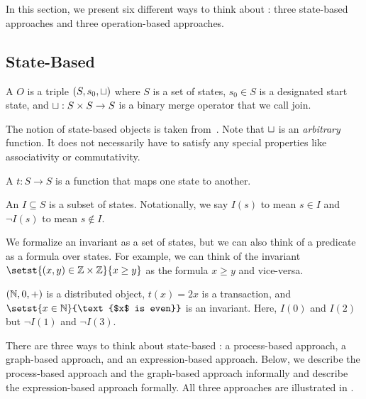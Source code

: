 \section{\Iconfluence{}}
In this section, we present six different ways to think about \Iconfluence{}:
three state-based approaches and three operation-based approaches.

\subsection{State-Based}
\begin{definition}
  A  $O$ is a triple $(S, s_0, \sqcup)$
  where $S$ is a set of states, $s_0 \in S$ is a designated start state, and
  $\sqcup: S \times S \to S$ is a binary merge operator that we call join.
\end{definition}

The notion of state-based objects is taken from~\cite{shapiro2011conflict}.
Note that $\sqcup$ is an \emph{arbitrary} function. It does not necessarily have
to satisfy any special properties like associativity or commutativity.

\begin{definition}
  A  $t: S \to S$ is a function that maps one
  state to another.
\end{definition}

\begin{definition}
  An  $I \subseteq S$ is a subset of states. Notationally,
  we say $I(s)$ to mean $s \in I$ and $\lnot I(s)$ to mean $s \notin I$.
\end{definition}

We formalize an invariant as a set of states, but we can also think of a
predicate as a formula over states. For example, we can think of the invariant
$\setst{(x, y) \in \ints \times \ints}{x \geq y}$ as the formula $x \geq y$ and
vice-versa.

\begin{example}
  $(\mathbb{N}, 0, +)$ is a distributed object, $t(x) = 2x$ is a transaction, and
  $\setst{x \in \nats}{\text{$x$ is even}}$ is an invariant. Here, $I(0)$ and
  $I(2)$ but $\lnot I(1)$ and $\lnot I(3)$.
\end{example}

There are three ways to think about state-based \Iconfluence{}: a process-based
approach, a graph-based approach, and an expression-based approach. Below, we
describe the process-based approach and the graph-based approach informally and
describe the expression-based approach formally. All three approaches are
illustrated in .

